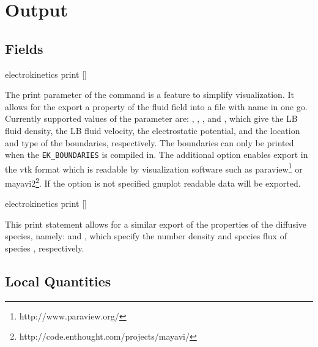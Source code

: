 \section{\label{ssec:ek-output}Output}

\subsection{\label{ssec:ek-output-fields}Fields}

\begin{essyntax}
  electrokinetics print 
    []
  \begin{features}
  \end{features}
\end{essyntax}
The print parameter of the  command is a feature to simplify 
visualization. It allows for the export a property of the fluid field into a 
file with name  in one go. Currently supported values of the 
parameter  are: , , , and
, which give the LB fluid density, the LB fluid velocity, the 
electrostatic potential, and the location and type of the boundaries, respectively.
The boundaries can only be printed when the \texttt{EK_BOUNDARIES} is compiled in.
The additional option  enables export in the vtk format which is readable
by visualization software such as paraview\footnote{http://www.paraview.org/} or 
mayavi2\footnote{http://code.enthought.com/projects/mayavi/}. If the  
option is not specified gnuplot readable data will be exported.

\begin{essyntax}
  electrokinetics  print    []
  \begin{features}
  \end{features}
\end{essyntax}
This print statement allows for a similar export of the properties of the 
diffusive species, namely:  and , which specify the 
number density and species flux of species , respectively.

\subsection{\label{ssec:ek-local-quantities}Local Quantities}

